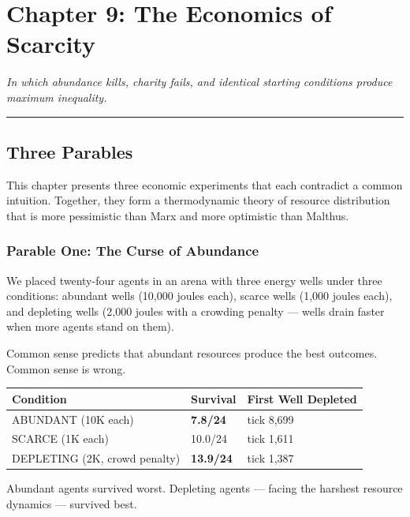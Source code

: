\chapter{Chapter 9: The Economics of Scarcity}\label{chapter-9-the-economics-of-scarcity}

\emph{In which abundance kills, charity fails, and identical starting conditions produce maximum inequality.}

\begin{center}\rule{0.5\linewidth}{0.5pt}\end{center}

\section{Three Parables}\label{three-parables}

This chapter presents three economic experiments that each contradict a common intuition. Together, they form a thermodynamic theory of resource distribution that is more pessimistic than Marx and more optimistic than Malthus.

\subsection{Parable One: The Curse of Abundance}\label{parable-one-the-curse-of-abundance}

We placed twenty-four agents in an arena with three energy wells under three conditions: abundant wells (10,000 joules each), scarce wells (1,000 joules each), and depleting wells (2,000 joules with a crowding penalty --- wells drain faster when more agents stand on them).

Common sense predicts that abundant resources produce the best outcomes. Common sense is wrong.

\begin{longtable}[]{@{}lll@{}}
\toprule\noalign{}
Condition & Survival & First Well Depleted \\
\midrule\noalign{}
\endhead
\bottomrule\noalign{}
\endlastfoot
ABUNDANT (10K each) & \textbf{7.8/24} & tick 8,699 \\
SCARCE (1K each) & 10.0/24 & tick 1,611 \\
DEPLETING (2K, crowd penalty) & \textbf{13.9/24} & tick 1,387 \\
\end{longtable}

Abundant agents survived worst. Depleting agents --- facing the harshest resource dynamics --- survived best.


